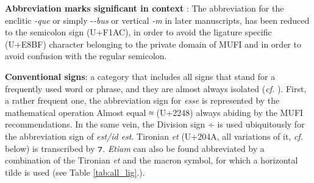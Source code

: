 \documentclass{article}
\newcommand{\juni}[1]{\textsf{\junicodeFont #1}}%
\begin{document}
\textbf{Abbreviation marks significant in context} : The abbreviation for the enclitic \textit{-que} or simply -\textit{-bus} or vertical \textit{-m} in later manuscripts, has been reduced to the semicolon \juni{} sign (U+F1AC), in order to avoid the ligature specific \juni{} (U+E8BF) character belonging to the private domain of MUFI and in order to avoid confusion with the regular semicolon.

\textbf{Conventional signs}:  a category that includes all signs that stand for a frequently used word or phrase, and they are almost always isolated (\textit{cf.} \cite{plutaabbreviations2020}). 
First, a rather frequent one, the abbreviation sign for \textit{esse} is represented by the mathematical operation Almost equal \juni{≈} (U+2248) always abiding by the MUFI recommendations. In the same vein, the Division sign \juni{÷} is used ubiquitously for the abbreviation sign of \textit{est/id est}. Tironian \textit{et} (U+204A, all variations of it, \textit{cf.} below) is transcribed by \juni{⁊}. \textit{Etiam} can also be found abbreviated by a combination of the Tironian \textit{et} and the macron symbol, for which a horizontal tilde is used (see Table \ref{tab:all_lig}.).%
\end{document}
